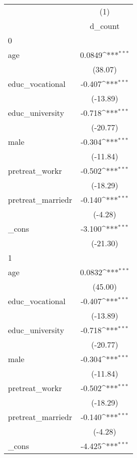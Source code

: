 {
\def\sym#1{\ifmmode^{#1}\else\(^{#1}\)\fi}
\begin{tabular}{l*{1}{c}}
\hline\hline
            &\multicolumn{1}{c}{(1)}\\
            &\multicolumn{1}{c}{d\_count}\\
\hline
0           &                     \\
age         &      0.0849\sym{***}\\
            &     (38.07)         \\
[1em]
educ\_vocational&      -0.407\sym{***}\\
            &    (-13.89)         \\
[1em]
educ\_university&      -0.718\sym{***}\\
            &    (-20.77)         \\
[1em]
male        &      -0.304\sym{***}\\
            &    (-11.84)         \\
[1em]
pretreat\_workr&      -0.502\sym{***}\\
            &    (-18.29)         \\
[1em]
pretreat\_marriedr&      -0.140\sym{***}\\
            &     (-4.28)         \\
[1em]
\_cons      &      -3.100\sym{***}\\
            &    (-21.30)         \\
\hline
1           &                     \\
age         &      0.0832\sym{***}\\
            &     (45.00)         \\
[1em]
educ\_vocational&      -0.407\sym{***}\\
            &    (-13.89)         \\
[1em]
educ\_university&      -0.718\sym{***}\\
            &    (-20.77)         \\
[1em]
male        &      -0.304\sym{***}\\
            &    (-11.84)         \\
[1em]
pretreat\_workr&      -0.502\sym{***}\\
            &    (-18.29)         \\
[1em]
pretreat\_marriedr&      -0.140\sym{***}\\
            &     (-4.28)         \\
[1em]
\_cons      &      -4.425\sym{***}\\

\end{tabular}}
